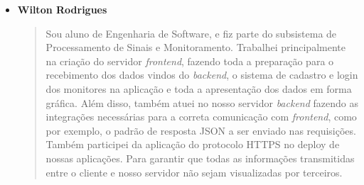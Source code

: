 \begin{itemize}
  \item \textbf{Wilton Rodrigues}
    \begin{quote}
      Sou aluno de Engenharia de Software, e fiz parte do subsistema de
      Processamento de Sinais e Monitoramento. Trabalhei principalmente na
      criação do servidor \textit{frontend}, fazendo toda a preparação para o recebimento
      dos dados vindos do \textit{backend}, o sistema de cadastro e login
      dos monitores na aplicação e toda a apresentação dos dados em forma gráfica.
      Além disso, também atuei no nosso servidor \textit{backend} fazendo as
      integrações necessárias para a correta comunicação com \textit{frontend},
      como por exemplo, o padrão de resposta JSON a ser enviado nas requisições.
      Também participei da aplicação do protocolo HTTPS no deploy de nossas
      aplicações. Para garantir que todas as informações transmitidas entre o
      cliente e nosso servidor não sejam visualizadas por terceiros.
    \end{quote}
\end{itemize}

